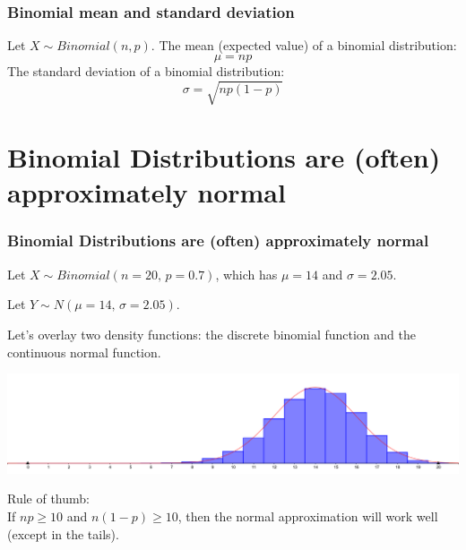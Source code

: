 \begin{frame}
\frametitle{Binomial mean and standard deviation}
Let $X\sim Binomial(n,p)$.
The mean (expected value) of a binomial distribution:
{\LARGE $$\mu = np $$}
The standard deviation of a binomial distribution:
{\LARGE $$ \sigma = \sqrt{np(1-p)} $$}
\end{frame}


\section{Binomial Distributions are (often) approximately normal}

\begin{frame}
\frametitle{Binomial Distributions are (often) approximately normal}
Let $X\sim Binomial(n=20,\,p=0.7)$, which has $\mu = 14$ and $\sigma = 2.05$. \pause

Let $Y\sim N(\mu=14,\, \sigma=2.05)$. \pause

Let's overlay two density functions: the discrete binomial function and the continuous normal function. \pause
\begin{center}
\includegraphics[scale=0.08]{3-4_binomial_distribution/figures/bin_norm/geogebra-export.png}
\end{center}

Rule of thumb:\\
If $np \ge 10$ and $n(1-p) \ge 10$, then the normal approximation will work well (except in the tails).
\end{frame}


